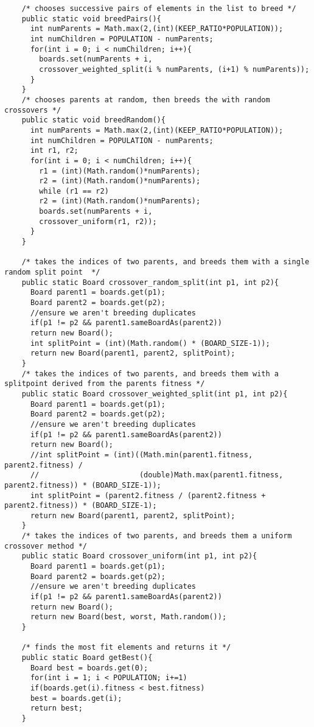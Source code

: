 \documentclass[a4paper,11pt]{article}
\begin{document}
\begin{lstlisting}
    /* chooses successive pairs of elements in the list to breed */
    public static void breedPairs(){
      int numParents = Math.max(2,(int)(KEEP_RATIO*POPULATION));
      int numChildren = POPULATION - numParents;
      for(int i = 0; i < numChildren; i++){
        boards.set(numParents + i,
        crossover_weighted_split(i % numParents, (i+1) % numParents));
      }
    }
    /* chooses parents at random, then breeds the with random crossovers */
    public static void breedRandom(){
      int numParents = Math.max(2,(int)(KEEP_RATIO*POPULATION));
      int numChildren = POPULATION - numParents;
      int r1, r2;
      for(int i = 0; i < numChildren; i++){
        r1 = (int)(Math.random()*numParents);
        r2 = (int)(Math.random()*numParents);
        while (r1 == r2)
        r2 = (int)(Math.random()*numParents);
        boards.set(numParents + i,
        crossover_uniform(r1, r2));
      }
    }

    /* takes the indices of two parents, and breeds them with a single random split point  */
    public static Board crossover_random_split(int p1, int p2){
      Board parent1 = boards.get(p1);
      Board parent2 = boards.get(p2);
      //ensure we aren't breeding duplicates
      if(p1 != p2 && parent1.sameBoardAs(parent2))
      return new Board();
      int splitPoint = (int)(Math.random() * (BOARD_SIZE-1));
      return new Board(parent1, parent2, splitPoint);
    }
    /* takes the indices of two parents, and breeds them with a splitpoint derived from the parents fitness */
    public static Board crossover_weighted_split(int p1, int p2){
      Board parent1 = boards.get(p1);
      Board parent2 = boards.get(p2);
      //ensure we aren't breeding duplicates
      if(p1 != p2 && parent1.sameBoardAs(parent2))
      return new Board(); 
      //int splitPoint = (int)((Math.min(parent1.fitness, parent2.fitness) /
      //                       (double)Math.max(parent1.fitness, parent2.fitness)) * (BOARD_SIZE-1));
      int splitPoint = (parent2.fitness / (parent2.fitness + parent2.fitness)) * (BOARD_SIZE-1);
      return new Board(parent1, parent2, splitPoint);
    }
    /* takes the indices of two parents, and breeds them a uniform crossover method */
    public static Board crossover_uniform(int p1, int p2){
      Board parent1 = boards.get(p1);
      Board parent2 = boards.get(p2);
      //ensure we aren't breeding duplicates
      if(p1 != p2 && parent1.sameBoardAs(parent2))
      return new Board(); 
      return new Board(best, worst, Math.random());
    }

    /* finds the most fit elements and returns it */
    public static Board getBest(){
      Board best = boards.get(0);
      for(int i = 1; i < POPULATION; i+=1)
      if(boards.get(i).fitness < best.fitness)
      best = boards.get(i);
      return best;
    }


\end{lstlisting}
\end{document}
